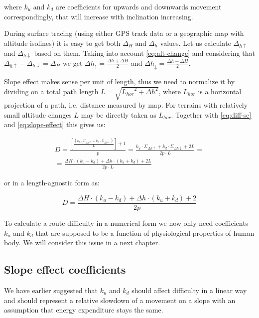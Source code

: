 \documentclass[12pt]{article}
\begin{document}
where $k_{u}$ and $k_{d}$ are coefficients for upwards and downwards movement correspondingly, that will increase with inclination increasing.

During surface tracing (using either GPS track data or a geographic map with altitude isolines) it is easy to get both $\Delta_{H}$ and $\Delta_{h}$ values. Let us calculate $\Delta_{h\uparrow}$ and $\Delta_{h\downarrow}$ based on them. Taking into account \ref{eq:alt-change} and considering that $\Delta_{h\uparrow}-\Delta_{h\downarrow}=\Delta_{H}$ we get $\Delta{h_{\uparrow}}=\frac{\Delta{h}+\Delta{H}}{2}$ and $\Delta{h_{\downarrow}}=\frac{\Delta{h}-\Delta{H}}{2}$.

Slope effect makes sense per unit of length, thus we need to normalize it by dividing on a total path length $L=\sqrt{{L_{hor}}^2 + {\Delta{h}}^2}$, where $L_{hor}$ is a horizontal projection of a path, i.e. distance measured by map. For terrains with relatively small altitude changes $L$ may be directly taken as $L_{hor}$. Together with \ref{eq:diff-se} and \ref{eq:slope-effect} this gives us:

\begin{equation} \label{eq:difficulty}
\begin{aligned}
D = \frac{\left[ \frac{ (k_{u}\cdot\Sigma_{\Delta{h\uparrow}}+k_{d}\cdot\Sigma_{\Delta{h\downarrow}}) }{L} \right] + 1}{p} = \frac{ k_{u}\cdot\Sigma_{\Delta{h\uparrow}}+k_{d}\cdot\Sigma_{\Delta{h\downarrow}} + 2L }{2p\cdot{L}} = \\
= \frac{ \Delta{H}\cdot{(k_{u}-k_{d})} + \Delta{h}\cdot{(k_{u}+k_{d})} + 2L }{2p\cdot{L}}
\end{aligned}
\end{equation}

or in a length-agnostic form as:

\begin{equation} \label{eq:difficulty-per-unit}
D=\frac{ \Delta{H}\cdot{(k_{u}-k_{d})} + \Delta{h}\cdot{(k_{u}+k_{d})} + 2 }{2p}
\end{equation}

To calculate a route difficulty in a numerical form we now only need coefficients $k_{u}$ and $k_{d}$ that are supposed to be a function of physiological properties of human body. We will consider this issue in a next chapter.


\subsection{Slope effect coefficients}
We have earlier suggested that $k_{u}$ and $k_{d}$ should affect difficulty in a linear way and should represent a relative slowdown of a movement on a slope with an assumption that energy expenditure stays the same.
\end{document}
